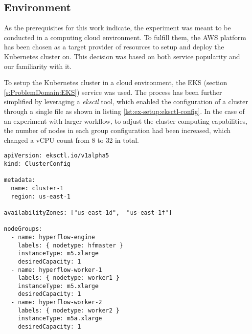 \subsection{Environment}\label{s:ExperimentSetup:Environment}

As the prerequisites for this work indicate, the experiment was meant to be conducted in a computing cloud environment. %
To fulfill them, the AWS platform has been chosen as a target provider of resources to setup and deploy the Kubernetes cluster on.
This decision was based on both service popularity and our familiarity with it.

%

To setup the Kubernetes cluster in a cloud environment, the EKS (section \ref{s:ProblemDomain:EKS}) service was used.
The process has been further simplified by leveraging a \emph{eksctl} tool, which enabled the configuration of a cluster through a single file as shown in listing \ref{lst:ex-setup:eksctl-config}.
In the case of an experiment with larger workflow, to adjust the cluster computing capabilities, the number of nodes in each group configuration had been increased, which changed a vCPU count from 8 to 32 in total.


\smallskip
\begin{center}
\begin{minipage}{0.70\textwidth}
\centering
\begin{lstlisting}
apiVersion: eksctl.io/v1alpha5
kind: ClusterConfig

metadata:
  name: cluster-1
  region: us-east-1

availabilityZones: ["us-east-1d",  "us-east-1f"]

nodeGroups:
  - name: hyperflow-engine
    labels: { nodetype: hfmaster }
    instanceType: m5.xlarge
    desiredCapacity: 1
  - name: hyperflow-worker-1
    labels: { nodetype: worker1 }
    instanceType: m5.xlarge
    desiredCapacity: 1
  - name: hyperflow-worker-2
    labels: { nodetype: worker2 }
    instanceType: m5a.xlarge
    desiredCapacity: 1
\end{lstlisting}
\label{lst:ex-setup:eksctl-config}
\end{minipage}
\end{center}


